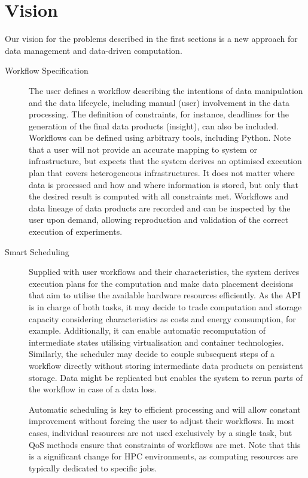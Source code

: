 \documentclass[a4paper]{article}
\begin{document}
\section{Vision}

Our vision for the problems described in the first sections is a new approach for data management and data-driven computation.


\begin{description}
\item[Workflow Specification]

The user defines a workflow describing the intentions of data manipulation and the data lifecycle, including manual (user) involvement in the data processing.
The definition of constraints, for instance, deadlines for the generation of the final data products (insight), can also be included.
Workflows can be defined using arbitrary tools, including Python.
Note that a user will not provide an accurate mapping to system or infrastructure, but expects that the system derives an optimised execution plan that covers heterogeneous infrastructures.
It does not matter where data is processed and how and where information is stored, but only that the desired result is computed with all constraints met.
Workflows and data lineage of data products are recorded and can be inspected by the user upon demand, allowing reproduction and validation of the correct execution of experiments.

\item[Smart Scheduling]

Supplied with user workflows and their characteristics, the system derives execution plans for the computation and make data placement decisions that aim to utilise the available hardware resources efficiently.
As the API is in charge of both tasks, it may decide to trade computation and storage capacity considering characteristics as costs and energy consumption, for example. Additionally, it can enable automatic recomputation of intermediate states utilising virtualisation and container technologies.
Similarly, the scheduler may decide to couple subsequent steps of a workflow directly without storing intermediate data products on persistent storage.
Data might be replicated but enables the system to rerun parts of the workflow in case of a data loss.

Automatic scheduling is key to efficient processing and will allow constant improvement without forcing the user to adjust their workflows.
In most cases, individual resources are not used exclusively by a single task, but QoS methods ensure that constraints of workflows are met.
Note that this is a significant change for HPC environments, as computing resources are typically dedicated to specific jobs.

\end{description}
\end{document}
